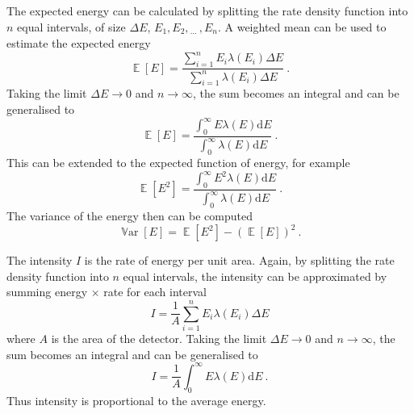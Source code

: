 \documentclass[12pt]{report}
\DeclareMathOperator{\expectation}{\mathbb{E}}
\DeclareMathOperator{\variance}{\mathbb{V}ar}
\newcommand{\diff}{\mathrm{d}}
\newcommand{\dotdotdot}{_{\phantom{.}\cdots}}
\begin{document}
The expected energy can be calculated by splitting the rate density function into $n$ equal intervals, of size $\Delta E$, $E_1,E_2,\dotdotdot,E_n$. A weighted mean can be used to estimate the expected energy
\begin{equation}
\expectation[E]=\frac{\sum_{i=1}^nE_i\lambda(E_i)\Delta E}{\sum_{i=1}^n\lambda(E_i)\Delta E} \ .
\end{equation}
Taking the limit $\Delta E\rightarrow0$ and $n\rightarrow\infty$, the sum becomes an integral and can be generalised to
\begin{equation}
\expectation[E]=\frac{\int_{0}^{\infty}E\lambda(E)\diff E}{\int_{0}^{\infty}\lambda(E)\diff E} \ .
\end{equation}
This can be extended to the expected function of energy, for example
\begin{equation}
\expectation[E^2]=\frac{\int_{0}^{\infty}E^2\lambda(E)\diff E}{\int_{0}^{\infty}\lambda(E)\diff E} \ .
\end{equation}
The variance of the energy then can be computed
\begin{equation}
\variance[E]=\expectation[E^2]-\left(\expectation[E]\right)^2 \ .
\end{equation}

The intensity $I$ is the rate of energy per unit area. Again, by splitting the rate density function into $n$ equal intervals, the intensity can be approximated by summing energy $\times$ rate for each interval
\begin{equation}
I = \frac{1}{A}\sum_{i=1}^nE_i\lambda(E_i)\Delta E
\end{equation}
where $A$ is the area of the detector.
Taking the limit $\Delta E\rightarrow0$ and $n\rightarrow\infty$, the sum becomes an integral and can be generalised to
\begin{equation}
I = \frac{1}{A}\int_{0}^{\infty}E\lambda(E)\diff E \ .
\end{equation}
Thus intensity is proportional to the average energy.
\end{document}
